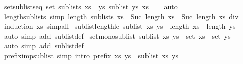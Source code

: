 \begin{isabellebody}
%
\endisadelimproof
\isanewline
{}\isamarkupfalse%
\ set{\isacharunderscore}sublists{\isacharunderscore}eq{\isacharcolon}\ {\isachardoublequoteopen}set\ {\isacharparenleft}sublists\ xs{\isacharparenright}\ {\isacharequal}\ {\isacharbraceleft}ys{\isachardot}\ sublist\ ys\ xs{\isacharbraceright}{\isachardoublequoteclose}\isanewline
%
\isadelimproof
\ \ %
\endisadelimproof
%
\isatagproof
{}\isamarkupfalse%
\ auto%
\endisatagproof
{\isafoldproof}%
%
\isadelimproof
\isanewline
%
\endisadelimproof
\isanewline
{}\isamarkupfalse%
\ length{\isacharunderscore}sublists\ {\isacharbrackleft}simp{\isacharbrackright}{\isacharcolon}\ {\isachardoublequoteopen}length\ {\isacharparenleft}sublists\ xs{\isacharparenright}\ {\isacharequal}\ Suc\ {\isacharparenleft}length\ xs\ {\isacharasterisk}\ Suc\ {\isacharparenleft}length\ xs{\isacharparenright}\ div\ {}{\isacharparenright}{\isachardoublequoteclose}\isanewline
%
\isadelimproof
\ \ %
\endisadelimproof
%
\isatagproof
{}\isamarkupfalse%
\ {\isacharparenleft}induction\ xs{\isacharparenright}\ simp{\isacharunderscore}all%
\endisatagproof
{\isafoldproof}%
%
\isadelimproof
\isanewline
%
\endisadelimproof
\isanewline
{}\isamarkupfalse%
\ sublist{\isacharunderscore}length{\isacharunderscore}le{\isacharcolon}\ {\isachardoublequoteopen}sublist\ xs\ ys\ {\isasymLongrightarrow}\ length\ xs\ {\isasymle}\ length\ ys{\isachardoublequoteclose}\isanewline
%
\isadelimproof
\ \ %
\endisadelimproof
%
\isatagproof
{}\isamarkupfalse%
\ {\isacharparenleft}auto\ simp\ add{\isacharcolon}\ sublist{\isacharunderscore}def{\isacharparenright}%
\endisatagproof
{\isafoldproof}%
%
\isadelimproof
\isanewline
%
\endisadelimproof
\isanewline
{}\isamarkupfalse%
\ set{\isacharunderscore}mono{\isacharunderscore}sublist{\isacharcolon}\ {\isachardoublequoteopen}sublist\ xs\ ys\ {\isasymLongrightarrow}\ set\ xs\ {\isasymsubseteq}\ set\ ys{\isachardoublequoteclose}\isanewline
%
\isadelimproof
\ \ %
\endisadelimproof
%
\isatagproof
{}\isamarkupfalse%
\ {\isacharparenleft}auto\ simp\ add{\isacharcolon}\ sublist{\isacharunderscore}def{\isacharparenright}%
\endisatagproof
{\isafoldproof}%
%
\isadelimproof
\isanewline
%
\endisadelimproof
\ \ \ \ \isanewline
{}\isamarkupfalse%
\ prefix{\isacharunderscore}imp{\isacharunderscore}sublist\ {\isacharbrackleft}simp{\isacharcomma}\ intro{\isacharbrackright}{\isacharcolon}\ {\isachardoublequoteopen}prefix\ xs\ ys\ {\isasymLongrightarrow}\ sublist\ xs\ ys{\isachardoublequoteclose}\isanewline

\end{isabellebody}
